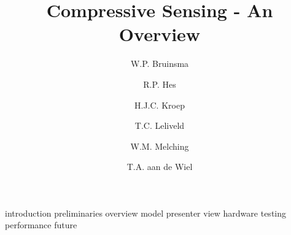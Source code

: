 \documentclass[a4paper, openany, oneside]{memoir}
\title{Compressive Sensing - An Overview}
\author{W.P. Bruinsma \and R.P. Hes \and H.J.C. Kroep \and T.C. Leliveld \and W.M. Melching \and T.A. aan de Wiel}
\begin{document}
{introduction}
{preliminaries}
{overview}
{model}
{presenter}
{view}
{hardware}
{testing}
{performance}
{future}
\end{document}
